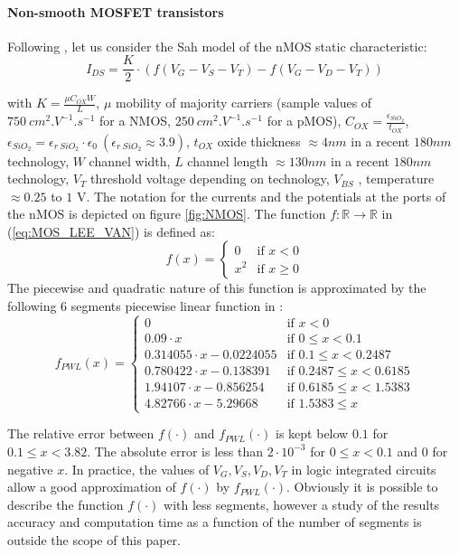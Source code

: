 \paragraph{Non-smooth MOSFET transistors}  Following \cite{leenaerts-bokhoven1998}, let us consider the Sah model of the nMOS static characteristic:
\begin{equation}
  \label{eq:MOS_LEE_VAN}
I_{DS} = \frac{K}{2} \cdot (f(V_G-V_S-V_T) - f(V_G-V_D-V_T))
\end{equation}


with $K = \frac{\mu C_{OX} W}{L}$, $\mu$ mobility of majority carriers (sample values of $750~cm^2.V^{-1}.s^{-1}$ for a NMOS, $250~cm^2.V^{-1}.s^{-1}$ for a pMOS), $C_{OX} = \frac{\epsilon_{SiO_2}}{t_{OX}}$, $\epsilon_{SiO_2} = \epsilon_{r~SiO_2} \cdot \epsilon_0 \ (\epsilon_{r~SiO_2} \approx 3.9)$, $t_{OX}$ oxide thickness $\approx 4 nm$ in a recent $180 nm$ technology, $W$ channel width, $L$ channel length $\approx 130 nm$ in a recent $180 nm$ technology, $V_T$ threshold voltage depending on technology, $V_{BS}$ , temperature $\approx 0.25$ to $1$ V. The notation for the currents and the potentials at the ports of the nMOS is depicted on figure \ref{fig:NMOS}. The function $f :\mathbb{R} \longrightarrow \mathbb{R}$ in (\ref{eq:MOS_LEE_VAN}) is defined as:
\[
f(x) = \left\{ \begin{array}{ll}
0 & \textrm{if $x < 0$}\\
x^2 & \textrm{if $x \geq 0$}
\end{array} \right.
\]
The piecewise and quadratic nature of this function is approximated by the following 6 segments piecewise linear
function in \cite{leenaerts-bokhoven1998}: 
\begin{equation}\label{6segments}
f_{PWL}(x) = \left\{ \begin{array}{ll}
0                            & \textrm{if $x < 0$}\\
0.09 \cdot x                 & \textrm{if $0 \leq x < 0.1$}\\
0.314055 \cdot x - 0.0224055 & \textrm{if $0.1 \leq x < 0.2487$}\\
0.780422 \cdot x - 0.138391  & \textrm{if $0.2487 \leq x < 0.6185$}\\
1.94107 \cdot x  - 0.856254  & \textrm{if $0.6185 \leq x < 1.5383$}\\
4.82766 \cdot x - 5.29668    & \textrm{if $1.5383 \leq x $}
\end{array} \right.
\end{equation}

The relative error between $f(\cdot)$ and $f_{PWL}(\cdot)$ is kept below $0.1$ for $0.1 \leq x < 3.82$. The absolute error is less than $2 \cdot 10^{-3}$ for $0 \leq x < 0.1$ and $0$ for negative $x$. In practice, the values of $V_G,V_S,V_D,V_T$ in logic integrated circuits allow  a good approximation of $f(\cdot)$ by $f_{PWL}(\cdot)$. Obviously it is possible to describe the function $f(\cdot)$ with less segments, however a study of the results accuracy and computation time as a function of the number of segments is outside the scope of this paper. 


